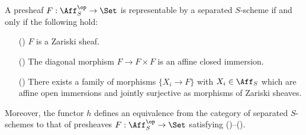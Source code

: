 \begin{proposition}\label{scheme functor represented by separated scheme iff}
A presheaf $F:\Aff_S^{\op}\to\Set$ is representable by a separated $S$-scheme if and only if the following hold:
\begin{enumerate}
    \item[(\rmnum{1})] $F$ is a Zariski sheaf.
    \item[(\rmnum{2})] The diagonal morphism $F\to F\times F$ is an affine closed immersion.
    \item[(\rmnum{3})] There exists a family of morphisms $\{X_i\to F\}$ with $X_i\in\Aff_S$ which are affine open immersions and jointly surjective as morphisms of Zariski sheaves. 
\end{enumerate}
Moreover, the functor $h$ defines an equivalence from the category of separated $S$-schemes to that of presheaves $F:\Aff_S^{\op}\to\Set$ satisfying ()--().
\end{proposition}
